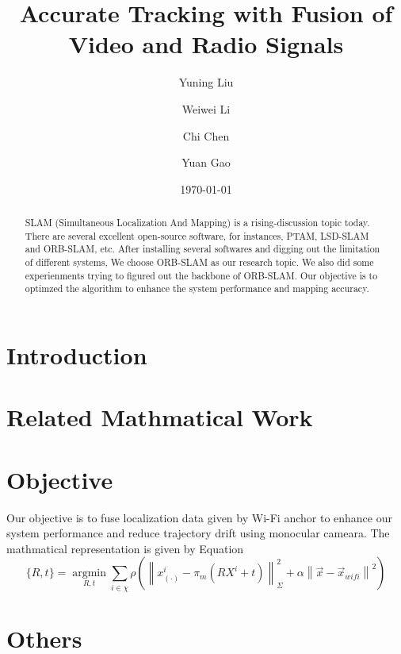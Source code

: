 \documentclass[twocolumn]{article}
\title{Accurate Tracking with Fusion of Video and Radio Signals}
\author{Yuning Liu}
\author{Weiwei Li}
\author{Chi Chen}
\author{Yuan Gao}
\affil{University of New South Wales}
\date{\today}
\begin{document}
\maketitle
\begin{abstract}
    SLAM (Simultaneous Localization And Mapping) is a rising-discussion topic today. There are several excellent open-source software, for instances, PTAM, LSD-SLAM and ORB-SLAM, etc. After installing several softwares and digging out the limitation of different systems, We choose ORB-SLAM as our research topic. We also did some experienments trying to figured out the backbone of ORB-SLAM. Our objective is to optimzed the algorithm to enhance the system performance and mapping accuracy. 
\end{abstract}

\section{Introduction}

\section{Related Mathmatical Work}

\section{Objective}

Our objective is to fuse localization data given by Wi-Fi anchor to enhance our system performance and reduce trajectory drift using monocular cameara. The mathmatical representation is given by Equation \label{wifi math}
\begin{equation}
    \{R, t\} = \operatorname*{argmin}_{R, t} \sum_{i\in \chi} \rho(\left\|x^i_{(\cdot)}-\pi_{m}(RX^i+t)\right\|^2_\Sigma+\alpha\left\|\vec{x}-\vec{x}_{wifi}\right\|^2) \label{wifi math}
\end{equation}

\section{Others}
\end{document}
